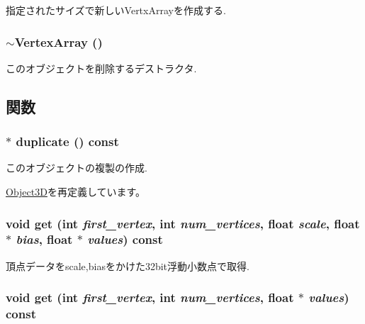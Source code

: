 指定されたサイズで新しいVertxArrayを作成する. \hypertarget{classm3g_1_1VertexArray_267fa63cb2f4216729437dc826415911}{
\subsubsection[{$\sim$VertexArray}]{\setlength{\rightskip}{0pt plus 5cm}$\sim${\bf VertexArray} ()}}
\label{classm3g_1_1VertexArray_267fa63cb2f4216729437dc826415911}


このオブジェクトを削除するデストラクタ. 

\subsection{関数}
\hypertarget{classm3g_1_1VertexArray_f0dc6a5510bf837ef48129f344d666a8}{
\subsubsection[{duplicate}]{ $\ast$ duplicate () const}}
\label{classm3g_1_1VertexArray_f0dc6a5510bf837ef48129f344d666a8}


このオブジェクトの複製の作成. 

\hyperlink{classm3g_1_1Object3D_a25110dac934f867b83b73ad4741a0f4}{Object3D}を再定義しています。\hypertarget{classm3g_1_1VertexArray_1adedf59e0c6a047242a3914ca52b929}{
\subsubsection[{get}]{\setlength{\rightskip}{0pt plus 5cm}void get (int {\em first\_\-vertex}, \/  int {\em num\_\-vertices}, \/  float {\em scale}, \/  float $\ast$ {\em bias}, \/  float $\ast$ {\em values}) const}}
\label{classm3g_1_1VertexArray_1adedf59e0c6a047242a3914ca52b929}


頂点データをscale,biasをかけた32bit浮動小数点で取得. \hypertarget{classm3g_1_1VertexArray_79b1ffd7586fe23fb5e31661e4d296e3}{
\subsubsection[{get}]{\setlength{\rightskip}{0pt plus 5cm}void get (int {\em first\_\-vertex}, \/  int {\em num\_\-vertices}, \/  float $\ast$ {\em values}) const}}
\label{classm3g_1_1VertexArray_79b1ffd7586fe23fb5e31661e4d296e3}


